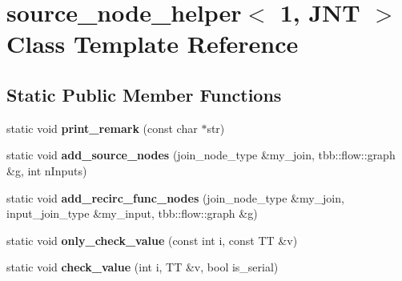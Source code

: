 \hypertarget{classsource__node__helper_3_011_00_01JNT_01_4}{}\section{source\+\_\+node\+\_\+helper$<$ 1, J\+N\+T $>$ Class Template Reference}
\label{classsource__node__helper_3_011_00_01JNT_01_4}
\subsection*{Static Public Member Functions}
\begin{DoxyCompactItemize}
\item 
\hypertarget{classsource__node__helper_3_011_00_01JNT_01_4_a57abcaed63cd6bcefe439f75c5ca521e}{}static void {\bfseries print\+\_\+remark} (const char $\ast$str)\label{classsource__node__helper_3_011_00_01JNT_01_4_a57abcaed63cd6bcefe439f75c5ca521e}

\item 
\hypertarget{classsource__node__helper_3_011_00_01JNT_01_4_a08a749dfcc00443492400b2c07715902}{}static void {\bfseries add\+\_\+source\+\_\+nodes} (join\+\_\+node\+\_\+type \&my\+\_\+join, tbb\+::flow\+::graph \&g, int n\+Inputs)\label{classsource__node__helper_3_011_00_01JNT_01_4_a08a749dfcc00443492400b2c07715902}

\item 
\hypertarget{classsource__node__helper_3_011_00_01JNT_01_4_aaf1789731535e0b9f4b0e4f68c0c6fda}{}static void {\bfseries add\+\_\+recirc\+\_\+func\+\_\+nodes} (join\+\_\+node\+\_\+type \&my\+\_\+join, input\+\_\+join\+\_\+type \&my\+\_\+input, tbb\+::flow\+::graph \&g)\label{classsource__node__helper_3_011_00_01JNT_01_4_aaf1789731535e0b9f4b0e4f68c0c6fda}

\item 
\hypertarget{classsource__node__helper_3_011_00_01JNT_01_4_abea8a043e721692a0b7b5ee8d953b7e1}{}static void {\bfseries only\+\_\+check\+\_\+value} (const int i, const T\+T \&v)\label{classsource__node__helper_3_011_00_01JNT_01_4_abea8a043e721692a0b7b5ee8d953b7e1}

\item 
\hypertarget{classsource__node__helper_3_011_00_01JNT_01_4_a2fd29212e8488fc75cd714c7ecbfa70c}{}static void {\bfseries check\+\_\+value} (int i, T\+T \&v, bool is\+\_\+serial)\label{classsource__node__helper_3_011_00_01JNT_01_4_a2fd29212e8488fc75cd714c7ecbfa70c}


\end{DoxyCompactItemize}
